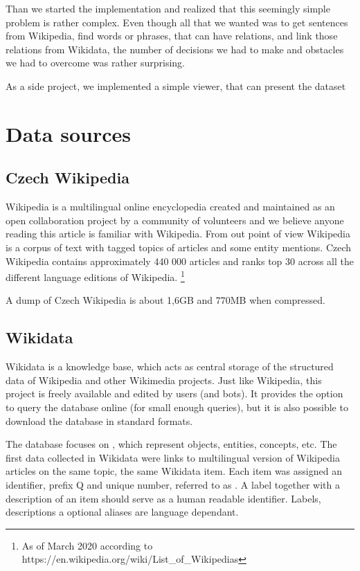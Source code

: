 Than we started the implementation and realized that this seemingly simple problem is rather complex. Even though all that we wanted was to get sentences from Wikipedia, find words or phrases, that can have relations, and link those relations from Wikidata, the number of decisions we had to make and obstacles we had to overcome was rather surprising.

As a side project, we implemented a simple viewer, that can present the dataset


\section{Data sources}


\subsection{Czech Wikipedia}

Wikipedia is a multilingual online encyclopedia created and maintained as an open collaboration project by a community of volunteers\cite{wiki:wiki} and we believe anyone reading this article is familiar with Wikipedia. From out point of view Wikipedia is a corpus of text with tagged topics of articles and some entity mentions. Czech Wikipedia contains approximately 440 000 articles and ranks top 30 across all the different language editions of Wikipedia.
\footnote{As of March 2020 according to https://en.wikipedia.org/wiki/List\_of\_Wikipedias}

A dump of Czech Wikipedia is about 1,6GB and 770MB when compressed.

\subsection{Wikidata}

Wikidata is a knowledge base, which acts as central storage of the structured data of Wikipedia and other Wikimedia projects. Just like Wikipedia, this project is freely available and edited by users (and bots). It provides the option to query the database online (for small enough queries), but it is also possible to download the database in standard formats.

The database focuses on , which represent objects, entities, concepts, etc.  The first data collected in Wikidata were links to multilingual version of Wikipedia articles on the same topic, the same Wikidata item. Each item was assigned an identifier, prefix Q and unique number, referred to as . A label together with a description of an item should serve as a human readable identifier. Labels, descriptions a optional aliases are language dependant. 

